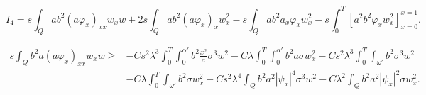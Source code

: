 \documentclass[10pt,a4paper]{amsart}
\begin{document}
\begin{equation}
\label{eq:int_I4}
I_4=s\int_{Q}ab^2(a\varphi_x)_{xx} w_x w+2s\int_{Q}ab^2(a\varphi_x )_xw_x^2-s\int_{Q}ab^2 a_x \varphi_xw_{x}^2-s\int_{0}^{T}\left[a^2b^2\varphi_x w_x^2\right]^{x=1}_{x=0}.
\end{equation}

\begin{lema}
\label{lemaA8}
	\begin{equation*}
    \begin{split}
		s \int_Q b^2 a (a \varphi_x)_{xx} w_x w \geq
		&- C s^2\lambda^3 \int_0^T \int_0^{\alpha'} b^2 \frac{x^2}{a}  \sigma^3 w^2 - C \lambda \int_0^T \int_0^{\alpha'} b^2 a \sigma w_x^2
		- Cs^2\lambda^3 \int_0^T\int_{\omega'} b^2 \sigma^3 w^2 \\
		&- C\lambda \int_0^T\int_{\omega'} b^2 \sigma w_x^2
		-Cs^2\lambda^4 \int_Q b^2 a^2 |\psi_x|^4 \sigma^3 w^2 - C\lambda^2 \int_Q b^2 a^2|\psi_x|^2\sigma w_x^2.
    \end{split}
	\end{equation*}
\end{lema}
\end{document}
